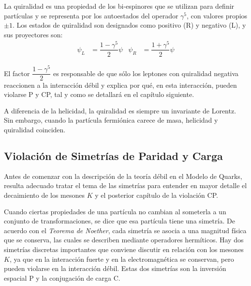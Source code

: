 La quiralidad es una propiedad de los bi-espinores que se utilizan para definir partículas y se representa por los autoestados del operador $\gamma^5$, con valores propios $\pm 1$. Los estados de quiralidad son designados como positivo (R) y negativo (L), y sus proyectores son:
\begin{align}
\psi_L &= \dfrac{1-\gamma^5}{2}\psi & \psi_R &= \dfrac{1+\gamma^5}{2}\psi
\end{align}

El factor $\dfrac{1-\gamma^5}{2}$ es responsable de que sólo los leptones con quiralidad negativa reaccionen a la interacción débil y explica por qué, en esta interacción, pueden violarse P y CP, tal y como se detallará en el capítulo siguiente.

A diferencia de la helicidad, la quiralidad es siempre un invariante de Lorentz. Sin embargo, cuando la partícula fermiónica carece de masa, helicidad y quiralidad coinciden.

\subsection{Violación de Simetrías de Paridad y Carga}\label{sec:symmetry}
Antes de comenzar con la descripción de la teoría débil en el Modelo de Quarks, resulta adecuado tratar el tema de las simetrías para entender en mayor detalle el decaimiento de los mesones $K$ y el posterior capítulo de la violación CP.

Cuando ciertas propiedades de una partícula no cambian al someterla a un conjunto de transformaciones, se dice que esa partícula tiene una simetría. De acuerdo con el \textit{Teorema de Noether}, cada simetría se asocia a una magnitud física que se conserva, las cuales se describen mediante operadores hermíticos. Hay dos simetrías discretas importantes que conviene discutir en relación con los mesones $K$, ya que en la interacción fuerte y en la electromagnética se conservan, pero pueden violarse en la interacción débil. Estas dos simetrías son la inversión espacial P y la conjugación de carga C.

